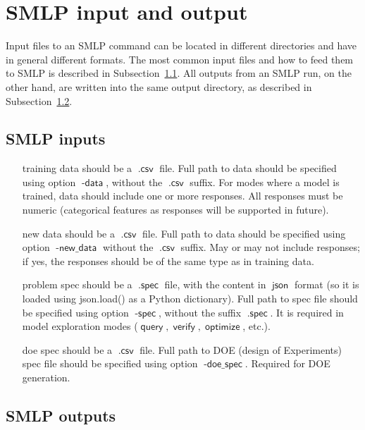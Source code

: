 \documentclass[a4paper,parskip=half]{article} %
\newcommand*\option[1]{\operatorname{\mathsf{#1}}} %
\newcommand*\suffix[1]{\operatorname{\mathsf{#1}}} %
\newcommand*\mode[1]{\operatorname{\mathsf{#1}}} %
\begin{document}
\section{SMLP input and output}

Input files to an SMLP command can be located in different directories and have in general different formats.
The most common input files and how to feed them to SMLP is described in Subsection~\ref{sec:smlp:inputs}. 
All outputs from an SMLP run, on the other hand, are written into the same output directory, as described in 
Subsection~\ref{sec:smlp:outputs}.

\subsection{SMLP inputs}\label{sec:smlp:inputs}

\begin{itemize}
\item[training data] should be a $\suffix{.csv}$ file. Full path to data should be specified using option $\option{-data}$, 
without the $\suffix{.csv}$ suffix. For modes where a model is trained, data should include one or more responses.
All responses must be numeric (categorical features as responses will be supported in future). 
\item [new data] should be a $\suffix{.csv}$ file. Full path to data should be specified using option $\option{-new\_data}$
without the $\suffix{.csv}$ suffix. May or may not include responses; if yes, the responses should be of the same type as in training data. 
\item [problem spec] should be  a $\suffix{.spec}$ file, with the content in $\suffix{json}$ format (so it is loaded using json.load() 
as a Python dictionary). Full path to spec file should be specified using option $\option{-spec}$, without the suffix 
$\suffix{.spec}$. It is required in model exploration modes ($\mode{query}, \mode{verify}, \mode{optimize}$, etc.).
\item[doe spec] should be a $\suffix{.csv}$ file. Full path to DOE (design of Experiments) spec file should be specified 
using option $\option{-doe\_spec}$. Required for DOE generation.
\end{itemize}

\subsection{SMLP outputs}\label{sec:smlp:outputs}
\end{document}
